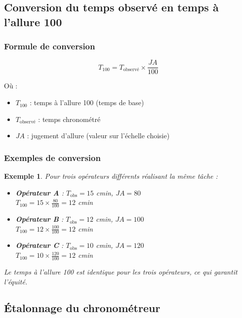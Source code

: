 \documentclass[a4paper,12pt]{article}
\newtheorem{exemple}{Exemple}[section]
\begin{document}
\subsection{Conversion du temps observé en temps à l'allure 100}

\subsubsection{Formule de conversion}

\[
T_{100} = T_{\text{observé}} \times \frac{JA}{100}
\]

Où :
\begin{itemize}
    \item $T_{100}$ : temps à l'allure 100 (temps de base)
    \item $T_{\text{observé}}$ : temps chronométré
    \item $JA$ : jugement d'allure (valeur sur l'échelle choisie)
\end{itemize}

\subsubsection{Exemples de conversion}

\begin{exemple}
Pour trois opérateurs différents réalisant la même tâche :

\begin{itemize}
    \item \textbf{Opérateur A} : $T_{\text{obs}} = 15$ cmin, $JA = 80$ \\
    $T_{100} = 15 \times \frac{80}{100} = 12$ cmin
    
    \item \textbf{Opérateur B} : $T_{\text{obs}} = 12$ cmin, $JA = 100$ \\
    $T_{100} = 12 \times \frac{100}{100} = 12$ cmin
    
    \item \textbf{Opérateur C} : $T_{\text{obs}} = 10$ cmin, $JA = 120$ \\
    $T_{100} = 10 \times \frac{120}{100} = 12$ cmin
\end{itemize}

Le temps à l'allure 100 est identique pour les trois opérateurs, ce qui garantit l'équité.
\end{exemple}

\subsection{Étalonnage du chronométreur}
\end{document}
